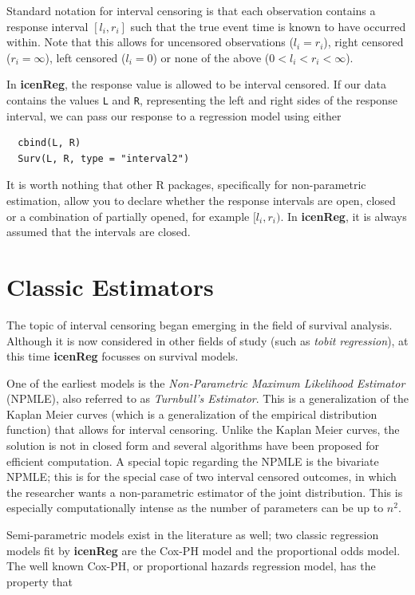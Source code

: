 \documentclass[11pt]{report}
\begin{document}
  Standard notation for interval censoring is that each observation contains a response
  interval $[l_i,r_i]$ such that the true event time is known to have occurred within. Note
  that this allows for uncensored observations ($l_i = r_i$), right censored 
  ($r_i = \infty$), left censored ($l_i = 0$) or none of the above 
  ($0 < l_i < r_i < \infty$). 
  
  In {\bf icenReg}, the response value is allowed to be interval censored. If our 
  data contains the values \texttt{L} and \texttt{R}, representing the left and 
  right sides of the response interval, we can pass our response to a regression model
  using either
  
  \begin{verbatim}
  cbind(L, R)
  Surv(L, R, type = "interval2")
  \end{verbatim}
  
  It is worth nothing that other R packages, specifically for non-parametric estimation, 
  allow you to declare whether the response intervals are open, closed or a combination
  of partially opened, for example $[l_i, r_i)$. In {\bf icenReg}, it is always assumed 
  that the intervals are closed. 
  
  \section{Classic Estimators}
  
  The topic of interval censoring began emerging in the field of survival analysis. 
  Although it is now considered in other fields of study (such as \emph{tobit regression}),
  at this time {\bf{icenReg}} focusses on survival models. 
  
  
  One of the earliest models is the \emph{Non-Parametric Maximum Likelihood Estimator} 
  (NPMLE), also referred to as \emph{Turnbull's Estimator}. This is a generalization of
  the Kaplan Meier curves (which is a generalization of the empirical distribution function)
  that allows for interval censoring. Unlike the Kaplan Meier curves, the solution is not
  in closed form and several algorithms have been proposed for efficient computation. 
  A special topic regarding the NPMLE is the bivariate NPMLE; this is for the special 
  case of two interval censored outcomes, in which the researcher wants a non-parametric 
  estimator of the joint distribution. This is especially computationally intense as the
  number of parameters can be up to $n^2$. 
  
  Semi-parametric models exist in the literature as well; two classic regression models
  fit by {\bf icenReg} are the Cox-PH model and the proportional odds model. 
  The well known Cox-PH, or proportional hazards regression model, has the property that
  
\end{document}
